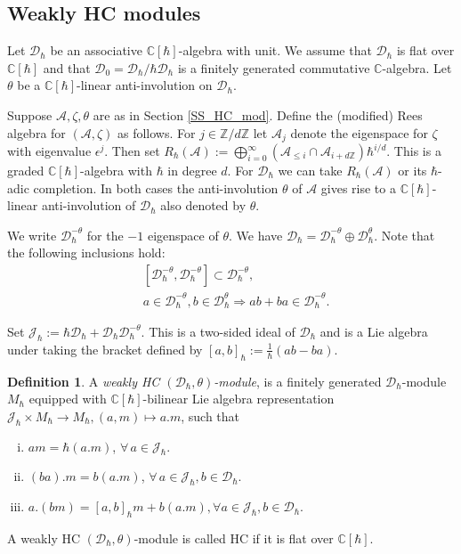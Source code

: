 \documentclass[12pt]{amsart}
\newcommand{\C}{\mathbb{C}}
\newcommand{\A}{\mathcal{A}}
\newcommand{\U}{\mathcal{U}}
\newcommand{\J}{\mathcal{J}}
\newcommand{\g}{\mathfrak{g}}
\newcommand{\Z}{\mathbb{Z}}
\newcommand{\Dcal}{\mathcal{D}}
\theoremstyle{definition}
\newtheorem{defi}[Thm]{Definition}
\numberwithin{equation}{section}
\begin{document}
\subsection{Weakly HC modules}\label{SS_weakly_HC}
Let $\Dcal_\hbar$ be an associative $\C[\hbar]$-algebra with unit. We assume that
$\Dcal_\hbar$ is flat over $\C[\hbar]$ and that $\Dcal_0 = \Dcal_\hbar/ \hbar \Dcal_\hbar$ is a finitely
generated commutative $\C$-algebra.
Let $\theta$ be a $\C[\hbar]$-linear anti-involution on $\Dcal_\hbar$.


Suppose $\A,\zeta,\theta$ are as in Section \ref{SS_HC_mod}.
Define the (modified) Rees algebra for $(\A,\zeta)$ as follows.
For $j\in \Z/d\Z$ let $\A_j$ denote the eigenspace for $\zeta$
with eigenvalue $\epsilon^j$. Then set $R_\hbar(\A):=\bigoplus_{i=0}^\infty
(\A_{\leqslant i}\cap \A_{i+d\Z})\hbar^{i/d}$. This is a graded $\C[\hbar]$-algebra
with $\hbar$ in degree $d$. For $\Dcal_\hbar$ we can take $R_\hbar(\A)$ or its
$\hbar$-adic completion. In both cases the anti-involution $\theta$
of $\A$ gives rise to a $\C[\hbar]$-linear anti-involution of $\Dcal_\hbar$
also denoted by $\theta$.


We write $\Dcal_\hbar^{-\theta}$ for the $-1$ eigenspace of $\theta$.
	We have $\Dcal_\hbar=\Dcal_\hbar^{-\theta}\oplus \Dcal_\hbar^\theta$.
	Note that the following inclusions hold:
	\begin{equation}\label{eq:invol_decomp_properties}
	\begin{split}
	&[\Dcal_\hbar^{-\theta},\Dcal_\hbar^{-\theta}]\subset \Dcal_\hbar^{-\theta}, \\
	&a\in \Dcal_\hbar^{-\theta}, b\in \Dcal_\hbar^\theta\Rightarrow ab+ba\in \Dcal_\hbar^{-\theta}.
	\end{split}
	\end{equation}


Set $\J_\hbar:=\hbar \mathcal{D}_\hbar+ \Dcal_\hbar\Dcal_\hbar^{-\theta}$. This is a two-sided ideal of $\Dcal_\hbar$ and is a Lie algebra under taking the bracket defined by
$[a,b]_\hbar:=\frac{1}{\hbar}(ab-ba)$.

\begin{defi}\label{defi:wHC}
	A {\it weakly HC $(\Dcal_\hbar, \theta)$-module}, is a finitely generated
	$\Dcal_\hbar$-module $M_\hbar$ equipped with
	$\C[\hbar]$-bilinear Lie algebra representation
	$\J_\hbar \times M_\hbar\rightarrow M_\hbar, (a,m)\mapsto a.m$, such that
	\begin{enumerate}[(i)]
		\item $am=\hbar(a.m)$, $\forall\, a \in \J_\hbar$.
		\item $(ba).m = b(a.m)$, $\forall\, a \in \J_\hbar, b \in \Dcal_\hbar$.
		\item $a.(bm)=[a,b]_\hbar m+b(a.m), \forall a\in \J_\hbar, b\in \Dcal_\hbar$.
	\end{enumerate}
A weakly HC $(\Dcal_\hbar,\theta)$-module is called HC if it is flat over $\C[\hbar]$.
\end{defi}
\end{document}
